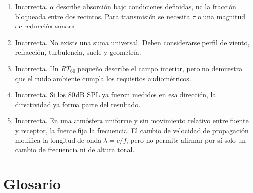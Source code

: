 \begin{enumerate}[label=\textbf{D\arabic*.},leftmargin=*]
    \item Incorrecta. \(\alpha\) describe absorción bajo condiciones definidas,
    no la fracción bloqueada entre dos recintos. Para transmisión se necesita
    \(\tau\) o una magnitud de reducción sonora.
    \item Incorrecta. No existe una suma universal. Deben considerarse perfil
    de viento, refracción, turbulencia, suelo y geometría.
    \item Incorrecta. Un \(RT_{60}\) pequeño describe el campo interior, pero no
    demuestra que el ruido ambiente cumpla los requisitos audiométricos.
    \item Incorrecta. Si los \(80\,\text{dB SPL}\) ya fueron medidos en esa
    dirección, la directividad ya forma parte del resultado.
    \item Incorrecta. En una atmósfera uniforme y sin movimiento relativo
    entre fuente y receptor, la fuente fija la frecuencia. El cambio de
    velocidad de propagación modifica la longitud de onda
    \(\lambda=c/f\), pero no permite afirmar por sí solo un cambio de
    frecuencia ni de altura tonal.
\end{enumerate}

\section{Glosario}
\label{sec:u9-glosario}

